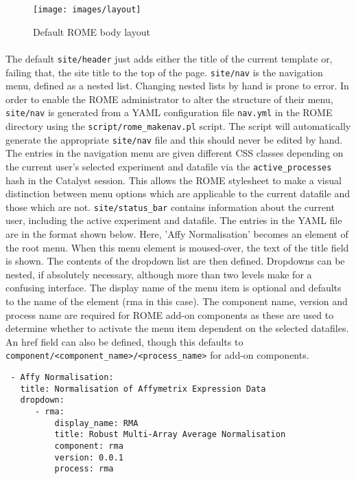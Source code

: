 \begin{figure}
\centering
\caption{Default ROME body layout}\label{fig:layout}
\texttt{[image: images/layout]}
\end{figure}

\paragraph{}
The default \texttt{site/header} just adds either the title of the current template or, failing that, the site title to the top of the page. \texttt{site/nav} is the navigation menu, defined as a nested list. Changing nested lists by hand is prone to error. In order to enable the ROME administrator to alter the structure of their menu, \texttt{site/nav} is generated from a YAML configuration file \texttt{nav.yml} in the ROME directory using the \texttt{script/rome\_makenav.pl} script. The script will automatically generate the appropriate \texttt{site/nav} file and this should never be edited by hand. The entries in the navigation menu are given different CSS classes depending on the current user's selected experiment and datafile via the \texttt{active\_processes} hash in the Catalyst session. This allows the ROME stylesheet to make a visual distinction between menu options which are applicable to the current datafile and those which are not. \texttt{site/status\_bar} contains information about the current user, including the active experiment and datafile. The entries in the YAML file are in the format shown below. Here, 'Affy Normalisation' becomes an element of the root menu. When this menu element is moused-over, the text of the title field is shown. The contents of the dropdown list are then defined. Dropdowns can be nested, if absolutely necessary, although more than two levels make for a confusing interface. The display name of the menu item is optional and defaults to the name of the element (rma in this case). The component name, version and process name are required for ROME add-on components as these are used to determine whether to activate the menu item dependent on the selected datafiles. An href field can also be defined, though this defaults to \texttt{component/<component\_name>/<process\_name>} for add-on components.

\begin{scriptsize}
\begin{verbatim}
 - Affy Normalisation:
   title: Normalisation of Affymetrix Expression Data 
   dropdown:
      - rma:
          display_name: RMA
          title: Robust Multi-Array Average Normalisation
          component: rma
          version: 0.0.1
          process: rma
\end{verbatim}
\end{scriptsize}


